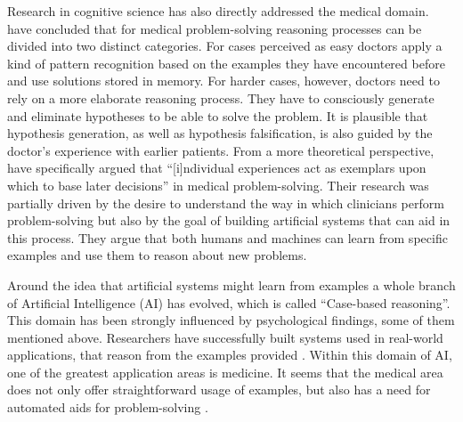 Research in cognitive science has also directly addressed the medical domain. \citet{Elstein2002} have concluded that for medical problem-solving reasoning processes can be divided into two distinct categories. For cases perceived as easy doctors apply a kind of pattern recognition based on the examples they have encountered before and use solutions stored in memory. For harder cases, however, doctors need to rely on a more elaborate reasoning process. They have to consciously generate and eliminate hypotheses to be able to solve the problem. It is plausible that hypothesis generation, as well as hypothesis falsification, is also guided by the doctor's experience with earlier patients. From a more theoretical perspective, \citet{Kolodner1987} have specifically argued that ``[i]ndividual experiences act as exemplars upon which to base later decisions'' in medical problem-solving. Their research was partially driven by the desire to understand the way in which clinicians perform problem-solving but also by the goal of building artificial systems that can aid in this process. They argue that both humans and machines can learn from specific examples and use them to reason about new problems.

Around the idea that artificial systems might learn from examples a whole branch of Artificial Intelligence (AI) has evolved, which is called ``Case-based reasoning''. This domain has been strongly influenced by psychological findings, some of them mentioned above. Researchers have successfully built systems used in real-world applications, that reason from the examples provided  \citep{Aamodt1994}. Within this domain of AI, one of the greatest application areas is medicine. It seems that the medical area does not only offer straightforward usage of examples, but also has a need for automated aids for problem-solving \citep{Begum2011}.


